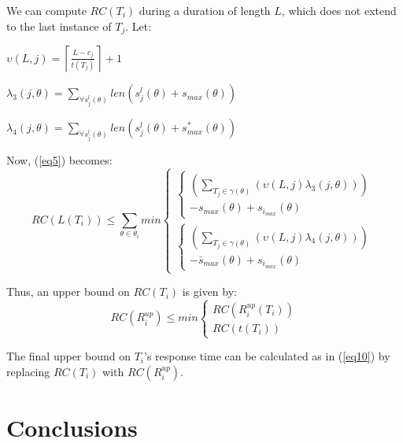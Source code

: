 \documentclass{sig-alternate}
\begin{document}
We can compute $RC\left(T_{i}\right)$ during a duration of length $L$, which does not extend to the last instance of $T_{j}$. Let:
\begin{compactitem}
\item $\upsilon\left(L,j\right)=\left\lceil\frac{L-c_{j}}{t\left(T_{j}\right)}\right\rceil+1$
\item $\lambda_{3}\left(j,\theta\right)=\sum_{\forall s_{j}^{l}\left(\theta\right)}len\left(s_{j}^{l}\left(\theta\right)+s_{max}\left(\theta\right)\right)$
\item $\lambda_{4}\left(j,\theta\right)=\sum_{\forall s_{j}^{l}\left(\theta\right)}len\left(s_{j}^{l}\left(\theta\right)+s_{max}^{*}\left(\theta\right)\right)$
\end{compactitem}
Now, (\ref{eq5}) becomes: 
\begin{equation}
RC\left(L\left(T_{i}\right)\right)\le \sum_{\theta\in\theta_{i}}min\begin{cases}
\begin{cases}
\left(\sum_{T_{j}\in\gamma\left(\theta\right)}\left(\upsilon\left(L,j\right)\lambda_{3}\left(j,\theta\right)\right)\right)\\
-s_{max}\left(\theta\right)+s_{i_{max}}\left(\theta\right)\end{cases}\\
\begin{cases}
\left(\sum_{T_{j}\in\gamma\left(\theta\right)}\left(\upsilon\left(L,j\right)\lambda_{4}\left(j,\theta\right)\right)\right)\\
-\bar{s}_{max}\left(\theta\right)+s_{i_{max}}\left(\theta\right)\end{cases}\end{cases}\label{eq16}\end{equation}


Thus, an upper bound on $RC(T_i)$ is given by:
\begin{equation}
RC(R_{i}^{up})\le min\begin{cases}
RC(R_{i}^{up}(T_{i}))\\
RC(t(T_{i}))\end{cases}
\label{eq17}
\end{equation}

The final upper bound on $T_{i}$'s response time can be calculated
as in (\ref{eq10}) by replacing $RC(T_{i})$ with
$RC(R_{i}^{up})$.


\section{Conclusions}
\label{sec:conclusions}
\end{document}

